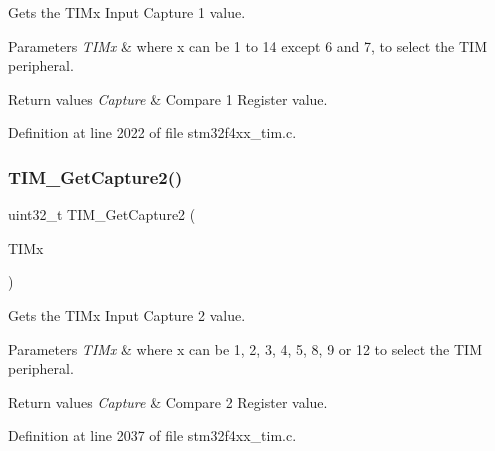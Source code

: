 Gets the T\+I\+Mx Input Capture 1 value. 


\begin{DoxyParams}{Parameters}
{\em T\+I\+Mx} & where x can be 1 to 14 except 6 and 7, to select the T\+IM peripheral. \\
\hline
\end{DoxyParams}

\begin{DoxyRetVals}{Return values}
{\em Capture} & Compare 1 Register value. \\
\hline
\end{DoxyRetVals}


Definition at line 2022 of file stm32f4xx\+\_\+tim.\+c.

\mbox{\label{group___t_i_m_ga2524cb5db14e388fb7f20c99fb3d58a5}} 
\subsubsection{\texorpdfstring{T\+I\+M\+\_\+\+Get\+Capture2()}{TIM\_GetCapture2()}}
{\footnotesize\ttfamily uint32\+\_\+t T\+I\+M\+\_\+\+Get\+Capture2 (\begin{DoxyParamCaption}\item[{\hyperlink{struct_t_i_m___type_def}{T\+I\+M\+\_\+\+Type\+Def} $\ast$}]{T\+I\+Mx }\end{DoxyParamCaption})}



Gets the T\+I\+Mx Input Capture 2 value. 


\begin{DoxyParams}{Parameters}
{\em T\+I\+Mx} & where x can be 1, 2, 3, 4, 5, 8, 9 or 12 to select the T\+IM peripheral. \\
\hline
\end{DoxyParams}

\begin{DoxyRetVals}{Return values}
{\em Capture} & Compare 2 Register value. \\
\hline
\end{DoxyRetVals}


Definition at line 2037 of file stm32f4xx\+\_\+tim.\+c.

\mbox{\label{group___t_i_m_ga71ee9ce2c535ec0fb3fac5f9119221f7}} 
